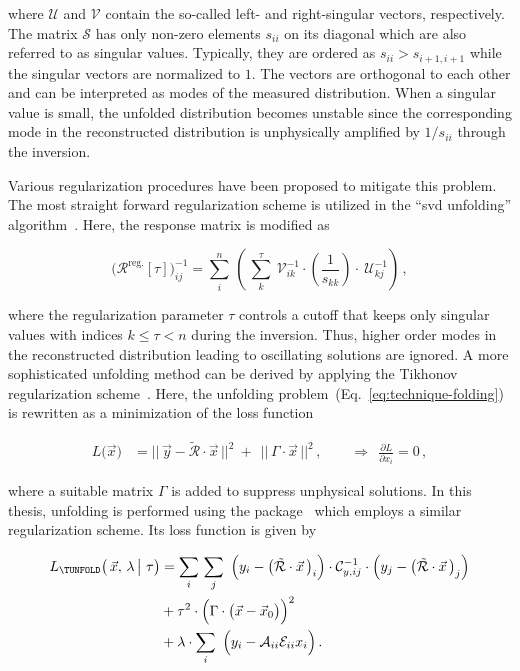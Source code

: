 where $\mathcal{U}$ and $\mathcal{V}$ contain the so-called left- and right-singular vectors, respectively. The matrix $\mathcal{S}$ has only non-zero elements $s_{ii}$ on its diagonal which are also referred to as singular values. Typically, they are ordered as $s_{ii}>s_{i+1,i+1}$ while the singular vectors are normalized to $1$. The vectors are orthogonal to each other and can be interpreted as modes of the measured distribution. When a singular value is small, the unfolded distribution becomes unstable since the corresponding mode in the reconstructed distribution is unphysically amplified by $1/s_{ii}$ through the inversion.

Various regularization procedures have been proposed to mitigate this problem. The most straight forward regularization scheme is utilized in the ``\gls{svd} unfolding'' algorithm~\cite{Hocker:1995kb}. Here, the response matrix is modified as

\begin{equation}
\Big(\mathcal{R}^\mathrm{reg.}[\tau]\Big)^{-1}_{ ij}=\sum_{i}^{n}\,\left(\,\sum_{k}^{\tau}~\mathcal{V}^{-1}_{ik}\cdot\left(\frac{1}{s_{kk}}\right)\cdot~\mathcal{U}^{-1}_{kj}\right)\,,
\end{equation}

where the regularization parameter $\tau$ controls a cutoff that keeps only singular values with indices $k\leq\tau<n$ during the inversion. Thus, higher order modes in the reconstructed distribution leading to oscillating solutions are ignored. A more sophisticated unfolding method can be derived by applying the Tikhonov regularization scheme~\cite{Tikhonov}. Here, the unfolding problem~(Eq.~\ref{eq:technique-folding}) is rewritten as a minimization of the loss function

\begin{align}
L\big(\vec{x}\big)&=\big|\big|\,\vec{y}-\tilde{\mathcal{R}}\cdot\vec{x} \,\big|\big|^{2}~+~~\big|\big|\,\Gamma\cdot\vec{x}\,\big|\big|^{2}\,,\qquad\Rightarrow~~\frac{\partial L}{\partial x_{i}}=0\,,
\end{align}

where a suitable matrix $\Gamma$ is added to suppress unphysical solutions. In this thesis, unfolding is performed using the \TUNFOLD[format=hyperbf] package~\cite{1748-0221-7-10-T10003} which employs a similar regularization scheme. Its loss function is given by

\begin{subequations}\label{eq:technique-tunfold}
\begin{align}
L_\mathrm{\TUNFOLD}\big(\,\vec{x},\,\lambda\,\big|~\tau\big)&=\sum_{i}\,\sum_{j}~\Big(y_{i}-\big(\tilde{\mathcal{R}}\cdot\vec{x}\,\big)_{i}\Big)\cdot\mathcal{C}_{y,ij}^{-1}\cdot\Big(y_{j}-\big(\tilde{\mathcal{R}}\cdot\vec{x}\,\big)_{j}\Big)\label{eq:technique-tunfold-response}\\
&+\tau^{2}\cdot\Big(\Gamma\cdot\big(\vec{x}-\vec{x}_{0}\big)\Big)^{2}\label{eq:technique-tunfold-regularization}\\
&+\lambda\cdot\sum_{i}~\Big(y_{i}-\mathcal{A}_{ii}\mathcal{E}_{ii}x_{i}\Big)\,. \label{eq:technique-tunfold-efficiency}
\end{align}
\end{subequations}


